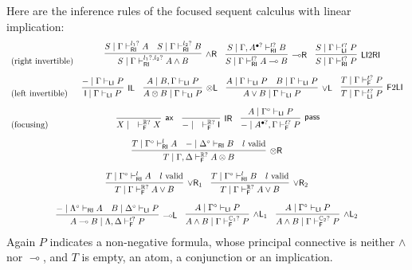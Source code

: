 \documentclass[submission,copyright,creativecommons]{eptcs}
\theoremstyle{definition}
\newcommand{\tl}{\otimes \mathsf{L}}
\newcommand{\tr}{\otimes \mathsf{R}}
\newcommand{\lright}{{\multimap}\mathsf{R}}
\newcommand{\lleft}{{\multimap}\mathsf{L}}
\newcommand{\pass}{\mathsf{pass}}
\newcommand{\unitl}{\mathsf{IL}}
\newcommand{\unitr}{\mathsf{IR}}
\newcommand{\andlone}{\land \mathsf{L}_{1}}
\newcommand{\andltwo}{\land \mathsf{L}_{2}}
\newcommand{\andr}{\land \mathsf{R}}
\newcommand{\orl}{\lor \mathsf{L}}
\newcommand{\orrone}{\lor \mathsf{R}_{1}}
\newcommand{\orrtwo}{\lor \mathsf{R}_{2}}
\newcommand{\ax}{\mathsf{ax}}
\newcommand{\ot}{\otimes}
\newcommand{\lolli}{\multimap}
\newcommand{\I}{\mathsf{I}}
\newcommand{\RI}{\mathsf{RI}}
\newcommand{\LI}{\mathsf{LI}}
\newcommand{\F}{\mathsf{F}}
\newcommand{\tE}{\mathbb{R}}
\begin{document}
Here are the inference rules of the focused sequent calculus with linear implication:
\begin{equation}\label{eq:focus:impl}
\scalebox{0.9}{$
  \begin{array}{lc}
    \text{(right invertible)} &
    \infer[\andr]{S\mid\Gamma\vdash^{l_1?,l_2?}_\RI A\land B}{
      S\mid\Gamma\vdash^{l_1?}_\RI A & S\mid\Gamma\vdash^{l_2?}_\RI B}
    \quad
    \infer[\lright]{S\mid\Gamma\vdash^{l?}_\RI A\lolli B}{
      S\mid\Gamma,A^{\bullet?}\vdash^{l?}_\RI B}
    \quad
    \infer[\LI2\RI]{S\mid\Gamma\vdash^{t?}_\RI P}{S\mid\Gamma\vdash^{t?}_\LI P}
    \\[10pt]
    \text{(left invertible)} &
    \infer[\unitl]{\I\mid\Gamma\vdash_\LI P}{{-}\mid\Gamma\vdash_\LI P}
    \quad
    \infer[\tl]{A\ot B\mid\Gamma\vdash_\LI P}{A\mid B,\Gamma\vdash_\LI P}
    \quad
    \infer[\orl]{A\lor B\mid\Gamma\vdash_\LI P}{A\mid\Gamma\vdash_\LI P & B\mid\Gamma\vdash_\LI P}
    \quad
    \infer[\F2\LI]{T\mid\Gamma\vdash^{t?}_\LI P}{T\mid\Gamma\vdash^{t?}_\F P}
    \\[10pt]
    \text{(focusing)} &\hspace*{-2cm}
    \infer[\ax]{X\mid\quad\vdash^{\tE?}_\F X}{}
    \quad
    \infer[\unitr]{{-}\mid\quad\vdash^{\tE?}_\F\I}{}
    \quad
    \infer[\pass]{{-}\mid A^{\bullet?},\Gamma\vdash^{t?}_\F P}{A\mid\Gamma^\circ\vdash_\LI P}
    \\[10pt]
    \multicolumn{2}{c}{
    \infer[\tr]{T\mid\Gamma,\Delta\vdash^{\tE?}_\F A\ot B}{
      T\mid\Gamma^\circ\vdash^l_\RI A & {-}\mid\Delta^\circ\vdash_\RI B & l\ \text{valid}}
    }
    \\[10pt]
    \multicolumn{2}{c}{
      \infer[\orrone]{T\mid\Gamma\vdash^{\tE?}_\F A\lor B}{
      T\mid\Gamma^\circ\vdash^l_\RI A & l\ \text{valid}}
    \quad
    \infer[\orrtwo]{T\mid\Gamma\vdash^{\tE?}_\F A\lor B}{
      T\mid\Gamma^\circ\vdash^l_\RI B & l\ \text{valid}}
    }
    \\[10pt]
    \multicolumn{2}{c}{
    \infer[\lleft]{A\lolli B\mid\Lambda,\Delta\vdash^{t?}_\F P}{
      {-}\mid\Lambda^\circ\vdash_\RI A & B\mid\Delta^\circ\vdash_\LI P}
    \quad
    \infer[\andlone]{A\land B\mid\Gamma\vdash^{\mathbb C_1?}_\F P}{A\mid\Gamma^\circ\vdash_\LI P}
    \quad
    \infer[\andltwo]{A\land B\mid\Gamma\vdash^{\mathbb C_2?}_\F P}{A\mid\Gamma^\circ\vdash_\LI P}
    }
  \end{array}$}
\end{equation}
Again $P$ indicates a non-negative formula, whose principal connective is neither $\land$ nor $\lolli$, and $T$ is empty, an atom, a conjunction or an implication.
\end{document}
